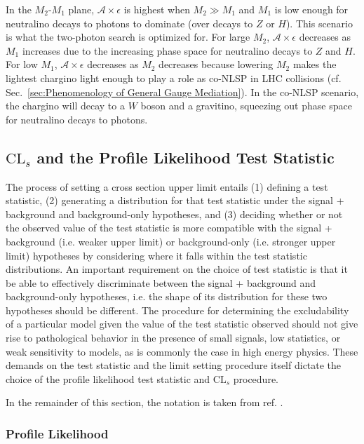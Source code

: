 \documentclass[dissertation.tex]{subfiles}
\begin{document}
In the $M_{2}$-$M_{1}$ plane, $\mathcal{A}\times\epsilon$ is highest when $M_{2} \gg M_{1}$ and $M_{1}$ is low enough for neutralino decays to photons to dominate (over decays to $Z$ or $H$).  This scenario is what the two-photon search is optimized for.  For large $M_{2}$, $\mathcal{A}\times\epsilon$ decreases as $M_{1}$ increases due to the increasing phase space for neutralino decays to $Z$ and $H$.  For low $M_{1}$, $\mathcal{A}\times\epsilon$ decreases as $M_{2}$ decreases because lowering $M_{2}$ makes the lightest chargino light enough to play a role as co-NLSP in LHC collisions (cf. Sec.~\ref{sec:Phenomenology of General Gauge Mediation}).  In the co-NLSP scenario, the chargino will decay to a $W$ boson and a gravitino, squeezing out phase space for neutralino decays to photons.

\subsection{$\mbox{CL}_{s}$ and the Profile Likelihood Test Statistic}
\label{sec:CLs and the Profile Likelihood Test Statistic}

The process of setting a cross section upper limit entails (1) defining a test statistic, (2) generating a distribution for that test statistic under the signal + background and background-only hypotheses, and (3) deciding whether or not the observed value of the test statistic is more compatible with the signal + background (i.e. weaker upper limit) or background-only (i.e. stronger upper limit) hypotheses by considering where it falls within the test statistic distributions.  An important requirement on the choice of test statistic is that it be able to effectively discriminate between the signal + background and background-only hypotheses, i.e. the shape of its distribution for these two hypotheses should be different.  The procedure for determining the excludability of a particular model given the value of the test statistic observed should not give rise to pathological behavior in the presence of small signals, low statistics, or weak sensitivity to models, as is commonly the case in high energy physics.  These demands on the test statistic and the limit setting procedure itself dictate the choice of the profile likelihood test statistic and $\mbox{CL}_{s}$ procedure.

In the remainder of this section, the notation is taken from ref. \cite{CMS-NOTE-2011/005}.

\subsubsection{Profile Likelihood}
\label{sec:Profile Likelihood}
\end{document}
